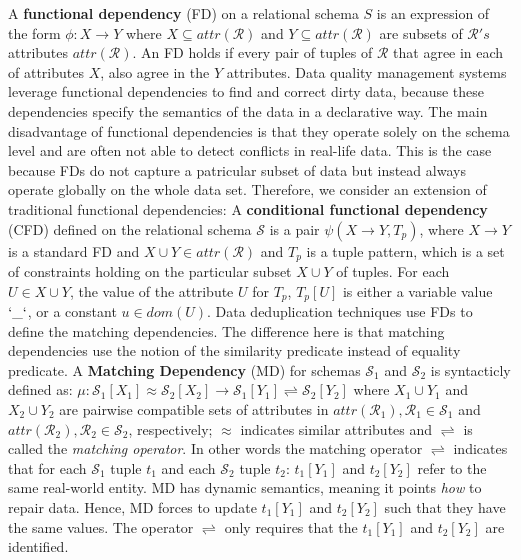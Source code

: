 A \textbf{functional dependency} (FD) on a relational schema $S$ is an expression of the form $\phi: X \rightarrow Y$ where $X \subseteq attr(\mathcal{R}) $ and $Y \subseteq attr(\mathcal{R}) $ are subsets of $\mathcal{R}'s$ attributes $attr(\mathcal{R})$. An FD holds if every pair of tuples of $\mathcal{R}$ that agree in each of attributes $X$, also agree in the $Y$ attributes. Data quality management systems leverage functional dependencies to find and correct dirty data, because these dependencies specify the semantics of the data in a declarative way. The main disadvantage of functional dependencies is that they operate solely on the schema level and are often not able to detect conflicts in real-life data. This is the case because FDs do not capture a patricular subset of data but instead always operate globally on the whole data set.
Therefore, we consider an extension of traditional functional dependencies:  A \textbf{conditional functional dependency} (CFD) 
defined on the relational schema $\mathcal{S}$ is a pair $\psi(X \rightarrow Y , T_p)$,  where $X \rightarrow Y$ is a standard 
FD and $X \cup Y \in attr(\mathcal{R})$ and $T_p$ is a tuple pattern, which is a set of constraints holding on the particular 
subset $X \cup Y$ of tuples. For each $U \in X \cup Y$, the value of the attribute $U$ for $T_p$, $T_p[U]$ is either a variable 
value $`\_`$, or a constant $u \in dom(U)$. Data deduplication techniques use FDs to define the matching dependencies. The 
difference here is that matching dependencies use the notion of the similarity predicate instead of equality predicate. A 
\textbf{Matching Dependency} (MD) for schemas $\mathcal{S}_1$ and $\mathcal{S}_2$ is syntacticly defined as:
$\mu: \mathcal{S}_1[X_1]\approx \mathcal{S}_2[X_2]\rightarrow \mathcal{S}_1[Y_1]\rightleftharpoons \mathcal{S}_2[Y_2]$ 
where $X_1 \cup Y_1$ and $X_2 \cup Y_2$ are pairwise compatible sets of attributes in $attr(\mathcal{R}_1), \mathcal{R}_1\in \mathcal{S}_1$ 
and $attr(\mathcal{R}_2), \mathcal{R}_2\in \mathcal{S}_2$, respectively; $\approx$ indicates similar attributes and $\rightleftharpoons$ 
is called the \textit{matching operator}. In other words the matching operator $\rightleftharpoons$ indicates that for each $\mathcal{S}_1$ tuple $t_1$ and each $\mathcal{S}_2$ tuple $t_2$: $t_1[Y_1]$ and $t_2[Y_2]$ refer to the same real-world entity. MD has dynamic semantics, meaning it points \textit{how} to repair data. Hence, MD forces to update $t_1[Y_1]$ and $t_2[Y_2]$ such that they have the same values. %
The operator $\rightleftharpoons$ only requires that the $t_1[Y_1]$ and $t_2[Y_2]$ are identified.
